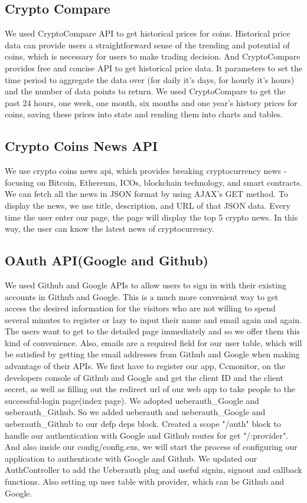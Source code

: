 \subsection{Crypto Compare}
We used CryptoCompare API to get historical prices for coins. 
Historical price data can provide users a straightforward sense 
of the trending and potential of coins, which is necessary for 
users to make trading decision. And CryptoCompare provides free 
and concise API to get historical price data. It parameters to 
set the time period to aggregate the data over (for daily it's 
days, for hourly it's hours) and the number of data points to 
return. We used CryptoCompare to get the past 24 hours, one week, 
one month, six months and one year's history prices for coins, 
saving these prices into state and rending them into charts and tables.
\subsection{Crypto Coins News API}
We use crypto coins news api, which provides breaking cryptocurrency
news - focusing on Bitcoin, Ethereum, ICOs, blockchain technology,
and smart contracts. We can fetch all the news in JSON format by
using AJAX's GET method. To display the news, we use title, description,
and URL of that JSON data. Every time the user enter our page, the 
page will display the top 5 crypto news. In this way, the user 
can know the latest news of cryptocurrency.
\subsection{OAuth API(Google and Github)}
We used Github and Google APIs to allow users to sign in with 
their existing accounts in Github and Google. This is a much 
more convenient way to get access the desired information for 
the visitors who are not willing to spend several minutes to 
register or lazy to input their name and email again and again. 
The users want to get to the detailed page immediately and so 
we offer them this kind of convenience. Also, emails are a 
required field for our user table, which will be satisfied by 
getting the email addresses from Github and Google when making 
advantage of their APIs. We first have to register our app, 
Ccmonitor, on the developers console of Github and Google and 
get the client ID and the client secret, as well as filling out 
the redirect url of our web app to take people to the successful-login 
page(index page). We adopted ueberauth\_Google and ueberauth\_Github. 
So we added ueberauth and ueberauth\_Google and ueberauth\_Github 
to our defp deps block. Created a scope "/auth" block to handle 
our authentication with Google and Github routes for get "/:provider". 
And also inside our config/config.exs, we will start the process 
of configuring our application to authenticate with Google and Github. 
We updated our AuthController to add the Ueberauth plug and useful 
signin, signout and callback functions. Also setting up user table 
with provider, which can be Github and Google.


